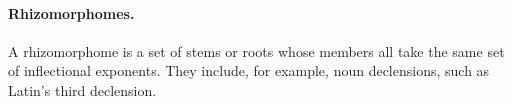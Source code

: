 \paragraph{Rhizomorphomes.} A rhizomorphome is a set of stems or roots
 whose members all take the same set of inflectional exponents. They include, for example,
 noun declensions, such as Latin's third declension.
